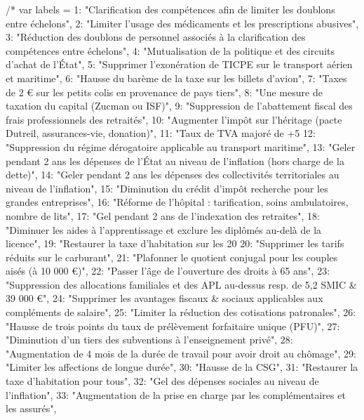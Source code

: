    /* var labels = {
        1:  "Clarification des compétences afin de limiter les doublons entre échelons",
        2:  "Limiter l'usage des médicaments et les prescriptions abusives",
        3:  "Réduction des doublons de personnel associés à la clarification des compétences entre échelons",
        4:  "Mutualisation de la politique et des circuits d'achat de l'État",
        5:  "Supprimer l'exonération de TICPE sur le transport aérien et maritime",
        6:  "Hausse du barème de la taxe sur les billets d'avion",
        7:  "Taxes de 2 € sur les petits colis en provenance de pays tiers",
        8:  "Une mesure de taxation du capital (Zucman ou ISF)",
        9:  "Suppression de l'abattement fiscal des frais professionnels des retraités",
        10: "Augmenter l'impôt sur l'héritage (pacte Dutreil, assurances-vie, donation)",
        11: "Taux de TVA majoré de +5 %
        12: "Suppression du régime dérogatoire applicable au transport maritime",
        13: "Geler pendant 2 ans les dépenses de l'État au niveau de l'inflation (hors charge de la dette)",
        14: "Geler pendant 2 ans les dépenses des collectivités territoriales au niveau de l'inflation",
        15: "Diminution du crédit d'impôt recherche pour les grandes entreprises",
        16: "Réforme de l'hôpital : tarification, soins ambulatoires, nombre de lits",
        17: "Gel pendant 2 ans de l'indexation des retraites",
        18: "Diminuer les aides à l'apprentissage et exclure les diplômés au-delà de la licence",
        19: "Restaurer la taxe d'habitation sur les 20 %
        20: "Supprimer les tarifs réduits sur le carburant",
        21: "Plafonner le quotient conjugal pour les couples aisés (à 10 000 €)",
        22: "Passer l'âge de l'ouverture des droits à 65 ans",
        23: "Suppression des allocations familiales et des APL au-dessus resp. de 5,2 SMIC & 39 000 €",
        24: "Supprimer les avantages fiscaux & sociaux applicables aux compléments de salaire",
        25: "Limiter la réduction des cotisations patronales",
        26: "Hausse de trois points du taux de prélèvement forfaitaire unique (PFU)",
        27: "Diminution d'un tiers des subventions à l'enseignement privé",
        28: "Augmentation de 4 mois de la durée de travail pour avoir droit au chômage",
        29: "Limiter les affections de longue durée",
        30: "Hausse de la CSG",
        31: "Restaurer la taxe d'habitation pour tous",
        32: "Gel des dépenses sociales au niveau de l'inflation",
        33: "Augmentation de la prise en charge par les complémentaires et les assurés",
}
